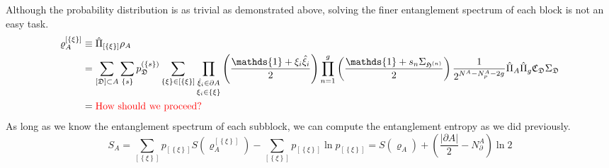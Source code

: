 \documentclass[12font]{article}
\theoremstyle{definition}
\newcommand{\lr}[1]{\left(  #1  \right)}
\newcommand{\lrg}[1]{\left\{  #1  \right\}}
\newcommand{\abs}[1]{\left|  #1  \right|}
\newcommand{\de}{\partial}
\newcommand{\alert}[1]{{\color{red}#1}}
\begin{document}
Although the probability distribution is as trivial as demonstrated above, solving the finer entanglement spectrum of each block is not an easy task.
\begin{align*}
\varrho_A^{[\lrg{\xi}]}
&\equiv
\hat{\Pi}_{[\lrg{\xi}]}\rho_A \\
&=
\sum_{[\mathfrak{D}]\subset A}
\sum_{\lrg{s}} p_\mathfrak{D}^{(\lrg{s})}
\sum_{\lrg{\xi}\in [\lrg{\xi}]} 
    \mathop{\prod_{\hat{\xi}_i\in\de A}}_{\xi_i\in\lrg{\xi}}
    \lr{\frac{\mathds{1} + \xi_i\hat{\xi}_i}{2}}
\prod_{n=1}^{g}\lr{\frac{\mathds{1} + s_n\Sigma_{\mathfrak{H}^{(n)}}}{2}}
\frac{1}{2^{N^A - N^A_p - 2g}}
\hat{\Pi}_A
\hat{\Pi}_g
\mathfrak{C}_\mathfrak{D}
\Sigma_\mathfrak{D} \\
& =\text{\alert{How should we proceed?}}
\end{align*}
As long as we know the entanglement spectrum of each subblock, we can compute the entanglement entropy as we did previously.
\begin{equation}
    S_A
    =
    \sum_{[\lrg{\xi}]} p_{[\lrg{\xi}]} S\lr{\varrho_A^{[\lrg{\xi}]}}
    -
    \sum_{[\lrg{\xi}]} p_{[\lrg{\xi}]} \ln  p_{[\lrg{\xi}]}
    =
    S\lr{\varrho_A}
    +
    \lr{\frac{\abs{\de A}}{2} - N^A_\de}\ln2
\end{equation}
\end{document}
